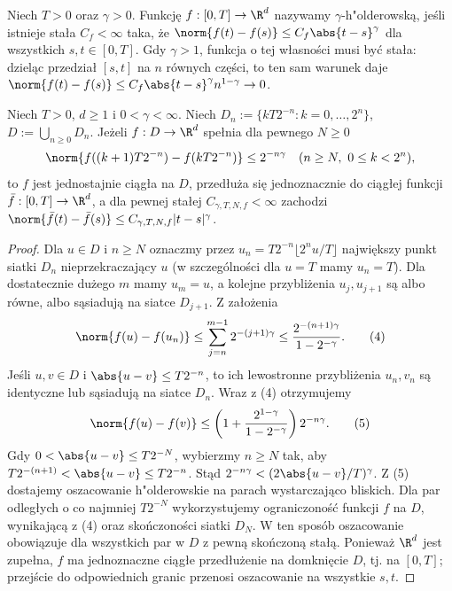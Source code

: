 \begin{definicja}
Niech $T>0$ oraz $\gamma>0$.
Funkcję $f:[0,T]\to\R^d$ nazywamy $\gamma$-h"olderowską,
jeśli istnieje stała $C_f<\infty$ taka, że
$\norm{f(t)-f(s)}\le C_f\abs{t-s}^{\gamma}$
dla wszystkich $s,t\in[0,T]$.
Gdy $\gamma>1$, funkcja o tej własności musi być stała:
dzieląc przedział $[s,t]$ na $n$ równych części,
to ten sam warunek daje
$\norm{f(t)-f(s)}\le C_f\abs{t-s}^{\gamma}n^{1-\gamma}\to0$.
\end{definicja}

\begin{lemat}
\label{lem:dyadyczny}
Niech $T>0$, $d\ge1$ i $0<\gamma<\infty$.
Niech $D_n:=\{kT2^{-n}:k=0,\ldots,2^n\}$,
$D:=\bigcup_{n\ge0}D_n$. Jeżeli $f:D\to\R^d$
spełnia dla pewnego $N\ge0$
\[
\norm{f((k+1)T2^{-n})-f(kT2^{-n})}
\le 2^{-n\gamma}
\quad(n\ge N,\ 0\le k<2^n),
\]
to $f$ jest jednostajnie ciągła na $D$,
przedłuża się jednoznacznie do ciągłej funkcji
$\bar f:[0,T]\to\R^d$, a dla pewnej stałej
$C_{\gamma,T,N,f}<\infty$ zachodzi
$\norm{\bar f(t)-\bar f(s)}\le C_{\gamma,T,N,f}|t-s|^\gamma$.
\end{lemat}
\begin{proof}
Dla $u\in D$ i $n\ge N$ oznaczmy przez
$u_n=T2^{-n}\lfloor 2^n u/T\rfloor$ największy punkt
siatki $D_n$ nieprzekraczający $u$ (w szczególności
dla $u=T$ mamy $u_n=T$).
Dla dostatecznie dużego $m$ mamy $u_m=u$,
a kolejne przybliżenia $u_j,u_{j+1}$ są albo równe,
albo sąsiadują na siatce $D_{j+1}$. Z założenia
\[
\norm{f(u)-f(u_n)}
\le\sum_{j=n}^{m-1}2^{-(j+1)\gamma}
\le\frac{2^{-(n+1)\gamma}}{1-2^{-\gamma}}.
\tag{4}
\]
Jeśli $u,v\in D$ i $\abs{u-v}\le T2^{-n}$,
to ich lewostronne przybliżenia $u_n,v_n$
są identyczne lub sąsiadują na siatce $D_n$.
Wraz z (4) otrzymujemy
\[
\norm{f(u)-f(v)}\le
\left(1+\frac{2^{1-\gamma}}{1-2^{-\gamma}}\right)
2^{-n\gamma}.
\tag{5}
\]
Gdy $0<\abs{u-v}\le T2^{-N}$, wybierzmy $n\ge N$
tak, aby $T2^{-(n+1)}<\abs{u-v}\le T2^{-n}$.
Stąd $2^{-n\gamma}<(2\abs{u-v}/T)^\gamma$.
Z (5) dostajemy oszacowanie h"olderowskie na parach
wystarczająco bliskich. Dla par odległych o co najmniej
$T2^{-N}$ wykorzystujemy ograniczoność funkcji $f$ na
$D$, wynikającą z (4) oraz skończoności siatki $D_N$.
W ten sposób oszacowanie obowiązuje dla wszystkich par
w $D$ z pewną skończoną stałą. Ponieważ $\R^d$ jest
zupełna, $f$ ma jednoznaczne ciągłe przedłużenie
na domknięcie $D$, tj. na $[0,T]$; przejście do
odpowiednich granic przenosi oszacowanie na wszystkie $s,t$.
\end{proof}

